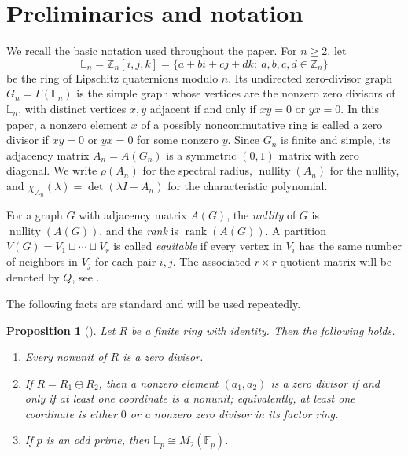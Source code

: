 \documentclass[12pt]{article}
\newtheorem{proposition}[theorem]{Proposition}
\theoremstyle{definition}
\newcommand{\Z}{\mathbb{Z}}
\newcommand{\F}{\mathbb{F}}
\newcommand{\LL}{\mathbb{L}}
\newcommand{\rank}{\operatorname{rank}}
\newcommand{\nullity}{\operatorname{nullity}}
\begin{document}
	\section{Preliminaries and notation}\label{sec:preliminaries}
	
	We recall the basic notation used throughout the paper. For $n\ge 2$, let
	$$
	\LL_n=\Z_n[i,j,k]
	=\{a+bi+cj+dk:\ a,b,c,d\in \Z_n\}
	$$
	be the ring of Lipschitz quaternions modulo $n$.
	Its undirected zero-divisor graph $G_n=\Gamma(\LL_n)$ is the simple graph whose vertices are the nonzero zero divisors of $\LL_n$, with distinct vertices $x,y$ adjacent if and only if $xy=0$ or $yx=0$. In this paper, a nonzero element $x$ of a possibly noncommutative ring is called a zero divisor if $xy=0$ or $yx=0$ for some nonzero $y$. Since $G_n$ is finite and simple, its adjacency matrix $A_n=A(G_n)$ is a symmetric $(0,1)$ matrix with zero diagonal. We write $\rho(A_n)$ for the spectral radius, $\nullity(A_n)$ for the nullity, and $\chi_{A_n}(\lambda)=\det(\lambda I-A_n)$ for the characteristic polynomial.
	
	For a graph $G$ with adjacency matrix $A(G)$, the \emph{nullity} of $G$ is $\nullity(A(G))$, and the \emph{rank} is $\rank(A(G))$. A partition $V(G)=V_1\sqcup\cdots\sqcup V_r$ is called \emph{equitable} if every vertex in $V_i$ has the same number of neighbors in $V_j$ for each pair $i,j$. The associated $r\times r$ quotient matrix will be denoted by $Q$, see \cite{godsil2001,brouwer2012}. 
	
	\medskip
	The following facts are standard and will be used repeatedly.
	\begin{proposition}[\cite{lam2001,grau2015,grau2017}]\label{prop:finitefacts}
		Let $R$ be a finite ring with identity. Then the following holds.
		\begin{enumerate}[label=\textup{(\roman*)},noitemsep]
			\item Every nonunit of $R$ is a zero divisor.
			\item If $R=R_1\oplus R_2$, then a nonzero element $(a_1,a_2)$ is a zero divisor if and only if at least one coordinate is a nonunit; equivalently, at least one coordinate is either $0$ or a nonzero zero divisor in its factor ring.
			\item If $p$ is an odd prime, then $\LL_p\cong M_2(\F_p)$.
		\end{enumerate}
	\end{proposition}
	
\end{document}

